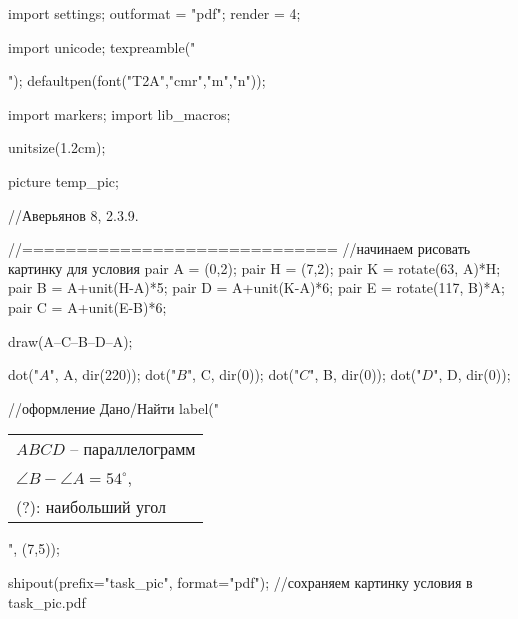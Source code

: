 import settings; 
outformat = "pdf";
render = 4;

import unicode;
texpreamble("\usepackage{xcolor}\usepackage{amsmath}\usepackage[russian]{babel}");
defaultpen(font("T2A","cmr","m","n"));

import markers;
import lib_macros;

unitsize(1.2cm);

picture temp_pic;

//Аверьянов 8, 2.3.9.

//=============================
//начинаем рисовать картинку для условия
pair A = (0,2);
pair H = (7,2);
pair K = rotate(63,  A)*H;
pair B = A+unit(H-A)*5;
pair D = A+unit(K-A)*6;
pair E = rotate(117,  B)*A;
pair C = A+unit(E-B)*6;

draw(A--C--B--D--A);



dot("$A$", A, dir(220));
dot("$B$", C, dir(0));
dot("$C$", B, dir(0));
dot("$D$", D, dir(0));





//оформление Дано/Найти
label("\begin{tabular}{l}
$ABCD$ -- параллелограмм\\
$\angle B-\angle A = 54^{\circ}$,\\
(?): наибольший угол
\end{tabular}", (7,5));

shipout(prefix="task_pic", format="pdf"); //сохраняем картинку условия в task_pic.pdf
